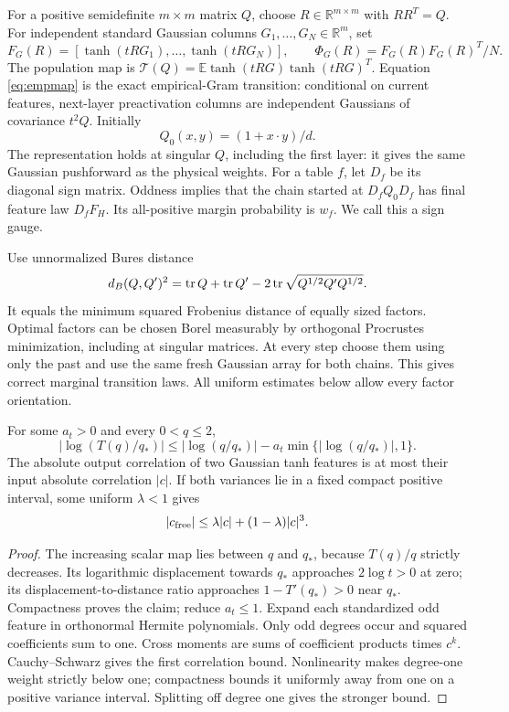 \documentclass[11pt]{article}
\newcommand{\R}{\mathbb R}\newcommand{\E}{\mathbb E}\newcommand{\Pp}{\mathbb P}
\begin{document}
For a positive semidefinite $m\times m$ matrix $Q$, choose $R\in\R^{m\times m}$ with $RR^T=Q$. For independent standard Gaussian columns $G_1,\ldots,G_N\in\R^m$, set
\begin{equation}\label{eq:empmap}
 F_G(R)=[\tanh(tRG_1),\ldots,\tanh(tRG_N)],\qquad
 \Phi_G(R)=F_G(R)F_G(R)^T/N.
\end{equation}
The population map is $\mathcal T(Q)=\E\tanh(tRG)\tanh(tRG)^T$. Equation \eqref{eq:empmap} is the exact empirical-Gram transition: conditional on current features, next-layer preactivation columns are independent Gaussians of covariance $t^2Q$. Initially
\begin{equation}\label{eq:initial}
 Q_0(x,y)=(1+x\cdot y)/d.
\end{equation}
The representation holds at singular $Q$, including the first layer: it gives the same Gaussian pushforward as the physical weights.
For a table $f$, let $D_f$ be its diagonal sign matrix. Oddness implies that the chain started at $D_fQ_0D_f$ has final feature law $D_fF_H$. Its all-positive margin probability is $w_f$. We call this a sign gauge.

Use unnormalized Bures distance
\begin{equation}\label{eq:bures}
 d_B(Q,Q')^2=\operatorname{tr} Q+\operatorname{tr} Q'-2\operatorname{tr}\sqrt{Q^{1/2}Q'Q^{1/2}}.
\end{equation}
It equals the minimum squared Frobenius distance of equally sized factors. Optimal factors can be chosen Borel measurably by orthogonal Procrustes minimization, including at singular matrices. At every step choose them using only the past and use the same fresh Gaussian array for both chains. This gives correct marginal transition laws. All uniform estimates below allow every factor orientation.

\begin{lemma}\label{lem:free}
For some $a_t>0$ and every $0<q\le2$,
\[
 |\log(T(q)/q_*)|\le |\log(q/q_*)|-a_t\min\{|\log(q/q_*)|,1\}.
\]
The absolute output correlation of two Gaussian tanh features is at most their input absolute correlation $|c|$. If both variances lie in a fixed compact positive interval, some uniform $\lambda<1$ gives
\[
 |c_{\rm free}|\le\lambda|c|+(1-\lambda)|c|^3.
\]
\end{lemma}
\begin{proof}
The increasing scalar map lies between $q$ and $q_*$, because $T(q)/q$ strictly decreases. Its logarithmic displacement towards $q_*$ approaches $2\log t>0$ at zero; its displacement-to-distance ratio approaches $1-T'(q_*)>0$ near $q_*$. Compactness proves the claim; reduce $a_t\le1$.
Expand each standardized odd feature in orthonormal Hermite polynomials. Only odd degrees occur and squared coefficients sum to one. Cross moments are sums of coefficient products times $c^k$. Cauchy--Schwarz gives the first correlation bound. Nonlinearity makes degree-one weight strictly below one; compactness bounds it uniformly away from one on a positive variance interval. Splitting off degree one gives the stronger bound.
\end{proof}
\end{document}
